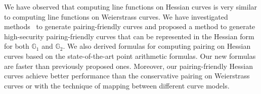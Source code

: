 We have observed that computing line functions on Hessian curves is very similar to computing line functions on Weierstrass curves.
We have investigated methods~\cite{2010/freeman} to generate pairing-friendly curves
and proposed a method to generate high-security pairing-friendly curves
that can be represented in the Hessian form for both $\mathbb{G}_1$ and $\mathbb{G}_2$.
We also derived formulas for computing pairing on Hessian curves based on the state-of-the-art point arithmetic formulas.
Our new formulas are faster than previously proposed ones.
Moreover, our pairing-friendly Hessian curves achieve better performance than the conservative pairing on Weierstrass curves
or with the technique of mapping between different curve models.



%
%

%
